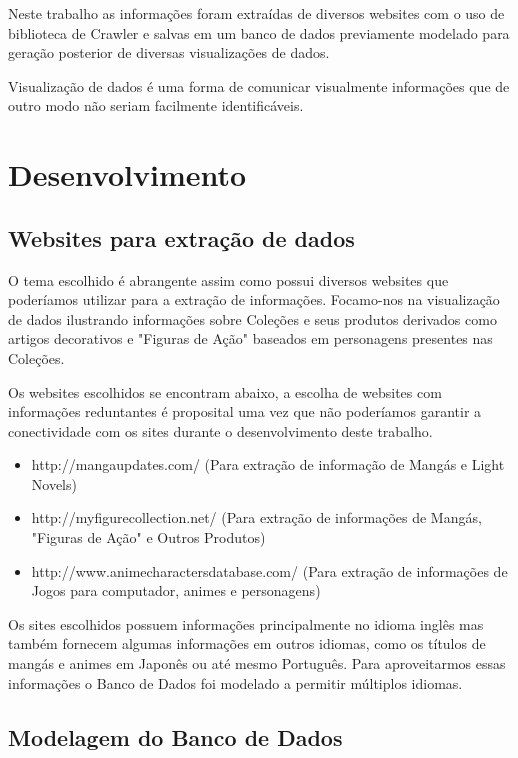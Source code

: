 \documentclass[12pt]{article}
\begin{document}
Neste trabalho as informações foram extraídas de diversos websites com o uso de biblioteca de Crawler e salvas em um banco de dados previamente modelado para geração posterior de diversas visualizações de dados. 

Visualização de dados é uma forma de comunicar visualmente informações que de outro modo não seriam facilmente identificáveis.


\section{Desenvolvimento}

\subsection{Websites para extração de dados}

O tema escolhido é abrangente assim como possui diversos websites que poderíamos utilizar para a extração de informações. Focamo-nos na visualização de dados ilustrando informações sobre Coleções e seus produtos derivados como artigos decorativos e "Figuras de Ação" baseados em personagens presentes nas Coleções. 

Os websites escolhidos se encontram abaixo, a escolha de websites com informações reduntantes é proposital uma vez que não poderíamos garantir a conectividade com os sites durante o desenvolvimento deste trabalho. 

\begin{itemize}
\item http://mangaupdates.com/ (Para extração de informação de Mangás e Light Novels)
\item http://myfigurecollection.net/ (Para extração de informações de Mangás, "Figuras de Ação" e Outros Produtos)
\item http://www.animecharactersdatabase.com/ (Para extração de informações de Jogos para computador, animes e personagens)
\end{itemize}

Os sites escolhidos possuem informações principalmente no idioma inglês mas também fornecem algumas informações em outros idiomas, como os títulos de mangás e animes em Japonês ou até mesmo Português. Para aproveitarmos essas informações o Banco de Dados foi modelado a permitir múltiplos idiomas. 

\subsection{Modelagem do Banco de Dados}
\end{document}
